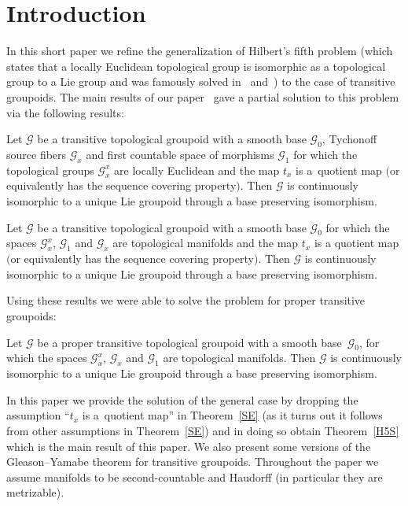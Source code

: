 \section{Introduction}
In this short paper we refine the generalization of Hilbert's fifth problem (which states that a locally Euclidean topological group is isomorphic as a topological group to a Lie group and was famously solved in~\cite{G} and~\cite{MZ}) to the case of transitive groupoids. The main results of our paper~\cite{H5oids} gave a partial solution to this problem via the following results:
\begin{tw}\label{strong}
Let $\mathcal{G}$ be a transitive topological groupoid with a smooth base $\mathcal{G}_0$, Tychonoff source fibers $\mathcal{G}_x$ and first countable space of morphisms $\mathcal{G}_1$ for which the topological groups $\mathcal{G}_x^x$ are locally Euclidean and the map $t_x$ is a~quotient map $($or equivalently has the sequence covering property$)$. Then $\mathcal{G}$ is continuously isomorphic to a unique Lie groupoid through a base preserving isomorphism.
\end{tw}

\begin{tw}\label{SE} Let $\mathcal{G}$ be a transitive topological groupoid with a smooth base $\mathcal{G}_0$ for which the spaces $\mathcal{G}_x^x$, $\mathcal{G}_1$ and $\mathcal{G}_x$ are topological manifolds and the map $t_x$ is a quotient map $($or equivalently has the sequence covering property$)$. Then $\mathcal{G}$ is continuously isomorphic to a unique Lie groupoid through a base preserving isomorphism.
\end{tw}
Using these results we were able to solve the problem for proper transitive groupoids:
\begin{tw}\label{prop} Let $\mathcal{G}$ be a proper transitive topological groupoid with a smooth base~$\mathcal{G}_0$, for which the spaces $\mathcal{G}_x^x$, $\mathcal{G}_x$ and $\mathcal{G}_1$ are topological manifolds. Then $\mathcal{G}$ is continuously isomorphic to a unique Lie groupoid through a base preserving isomorphism.
\end{tw}

In this paper we provide the solution of the general case by dropping the assumption ``$t_x$ is a~quotient map'' in Theorem~\ref{SE} (as it turns out it follows from other assumptions in Theorem~\ref{SE}) and in doing so obtain Theorem~\ref{H5S} which is the main result of this paper. We also present some versions of the Gleason--Yamabe theorem for transitive groupoids. Throughout the paper we assume manifolds to be second-countable and Haudorff (in particular they are metrizable).

